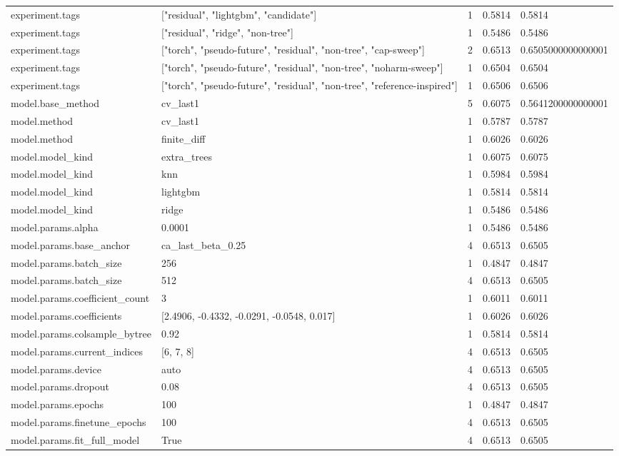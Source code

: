 \begin{tabular}{lllll}
experiment.tags & ["residual", "lightgbm", "candidate"] & 1 & 0.5814 & 0.5814 \\
experiment.tags & ["residual", "ridge", "non-tree"] & 1 & 0.5486 & 0.5486 \\
experiment.tags & ["torch", "pseudo-future", "residual", "non-tree", "cap-sweep"] & 2 & 0.6513 & 0.6505000000000001 \\
experiment.tags & ["torch", "pseudo-future", "residual", "non-tree", "noharm-sweep"] & 1 & 0.6504 & 0.6504 \\
experiment.tags & ["torch", "pseudo-future", "residual", "non-tree", "reference-inspired"] & 1 & 0.6506 & 0.6506 \\
model.base\_method & cv\_last1 & 5 & 0.6075 & 0.5641200000000001 \\
model.method & cv\_last1 & 1 & 0.5787 & 0.5787 \\
model.method & finite\_diff & 1 & 0.6026 & 0.6026 \\
model.model\_kind & extra\_trees & 1 & 0.6075 & 0.6075 \\
model.model\_kind & knn & 1 & 0.5984 & 0.5984 \\
model.model\_kind & lightgbm & 1 & 0.5814 & 0.5814 \\
model.model\_kind & ridge & 1 & 0.5486 & 0.5486 \\
model.params.alpha & 0.0001 & 1 & 0.5486 & 0.5486 \\
model.params.base\_anchor & ca\_last\_beta\_0.25 & 4 & 0.6513 & 0.6505 \\
model.params.batch\_size & 256 & 1 & 0.4847 & 0.4847 \\
model.params.batch\_size & 512 & 4 & 0.6513 & 0.6505 \\
model.params.coefficient\_count & 3 & 1 & 0.6011 & 0.6011 \\
model.params.coefficients & [2.4906, -0.4332, -0.0291, -0.0548, 0.017] & 1 & 0.6026 & 0.6026 \\
model.params.colsample\_bytree & 0.92 & 1 & 0.5814 & 0.5814 \\
model.params.current\_indices & [6, 7, 8] & 4 & 0.6513 & 0.6505 \\
model.params.device & auto & 4 & 0.6513 & 0.6505 \\
model.params.dropout & 0.08 & 4 & 0.6513 & 0.6505 \\
model.params.epochs & 100 & 1 & 0.4847 & 0.4847 \\
model.params.finetune\_epochs & 100 & 4 & 0.6513 & 0.6505 \\
model.params.fit\_full\_model & True & 4 & 0.6513 & 0.6505 \\

\end{tabular}
